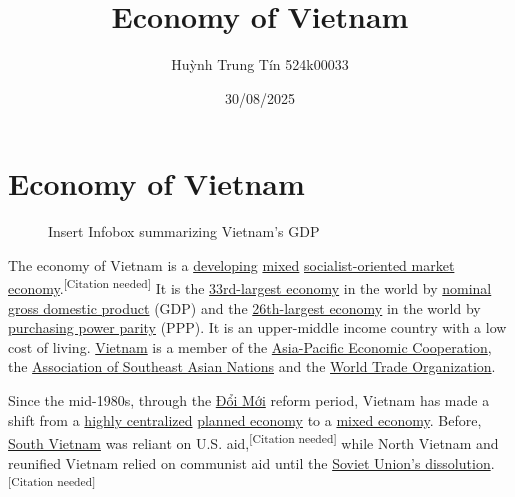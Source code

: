 \documentclass[openany]{book}
\title{Economy of Vietnam}
\author{Huỳnh Trung Tín 524k00033}
\date{30/08/2025}
\makeatletter
\renewcommand\mainmatter{%
    \clearpage
  \@mainmattertrue
  \pagenumbering{arabic}}
\makeatother
\begin{document}
\frontmatter
\maketitle
\tableofcontents
\mainmatter
\chapter{Economy of Vietnam}

\begin{figure}
    \begin{framed}
    Insert Infobox summarizing Vietnam's GDP
    \end{framed}
\end{figure}
The economy of Vietnam is a \href{https://en.wikipedia.org/wiki/Developing_economy}{developing} \href{https://en.wikipedia.org/wiki/Mixed_economy}{mixed} \href{https://en.wikipedia.org/wiki/Socialist-oriented_market_economy}{socialist-oriented market economy}.\textsuperscript{[Citation needed]} It is the \href{https://en.wikipedia.org/wiki/List_of_countries_by_GDP_(nominal)}{33rd-largest economy} in the world by \href{https://en.wikipedia.org/wiki/Nominal_gross_domestic_product}{nominal gross domestic product} (GDP) and the \href{https://en.wikipedia.org/wiki/List_of_countries_by_GDP_(PPP)}{26th-largest economy} in the world by \href{https://en.wikipedia.org/wiki/Purchasing_power_parity}{purchasing power parity} (PPP). It is an upper-middle income country with a low cost of living. \href{https://en.wikipedia.org/wiki/Vietnam}{Vietnam} is a member of the \href{https://en.wikipedia.org/wiki/Asia-Pacific_Economic_Cooperation}{Asia-Pacific Economic Cooperation}, the \href{https://en.wikipedia.org/wiki/Association_of_Southeast_Asian_Nations}{Association of Southeast Asian Nations} and the \href{https://en.wikipedia.org/wiki/World_Trade_Organization}{World Trade Organization}.

Since the mid-1980s, through the \href{https://en.wikipedia.org/wiki/%C4%90%E1%BB%95i_M%E1%BB%9Bi}{Đổi Mới} reform period, Vietnam has made a shift from a \href{https://en.wikipedia.org/wiki/Centralization}{highly centralized} \href{https://en.wikipedia.org/wiki/Planned_economy}{planned economy} to a \href{https://en.wikipedia.org/wiki/Mixed_economy}{mixed economy}. Before, \href{https://en.wikipedia.org/wiki/North_Vietnam}{South Vietnam} was reliant on U.S. aid,\textsuperscript{[Citation needed]} while North Vietnam and reunified Vietnam relied on communist aid until the \href{https://en.wikipedia.org/wiki/Dissolution_of_the_Soviet_Union}{Soviet Union's dissolution}.\textsuperscript{[Citation needed]}
\end{document}
